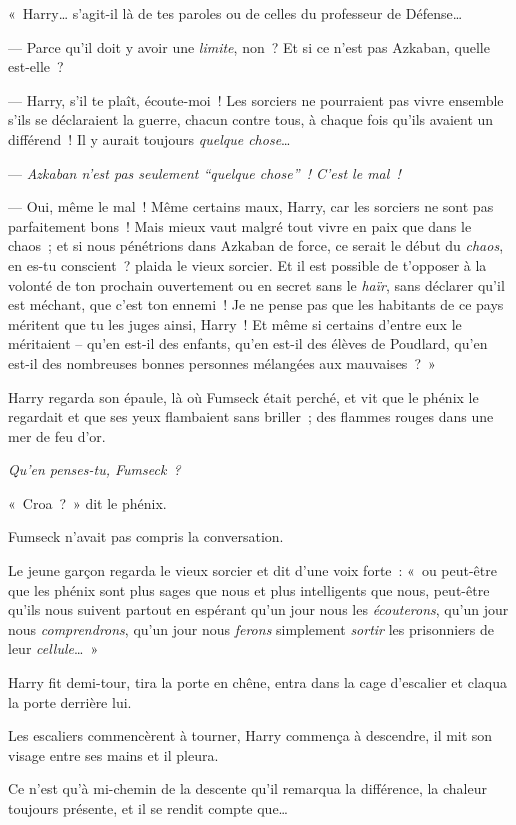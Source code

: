 «~Harry… s'agit-il là de tes paroles ou de celles du professeur de Défense…

--- Parce qu'il doit y avoir une \emph{limite}, non~?
Et si ce n'est pas Azkaban, quelle est-elle~?

--- Harry, s'il te plaît, écoute-moi~!
Les sorciers ne pourraient pas vivre ensemble s'ils se déclaraient la guerre, chacun contre tous, à chaque fois qu'ils avaient un différend~!
Il y aurait toujours \emph{quelque chose}…

--- \emph{Azkaban n'est pas seulement “quelque chose”~!
C'est le mal~!}

--- Oui, même le mal~!
Même certains maux, Harry, car les sorciers ne sont pas parfaitement bons~!
Mais mieux vaut malgré tout vivre en paix que dans le chaos~; et si nous pénétrions dans Azkaban de force, ce serait le début du \emph{chaos}, en es-tu conscient~? plaida le vieux sorcier.
Et il est possible de t'opposer à la volonté de ton prochain ouvertement ou en secret sans le \emph{haïr}, sans déclarer qu'il est méchant, que c'est ton ennemi~!
Je ne pense pas que les habitants de ce pays méritent que tu les juges ainsi, Harry~!
Et même si certains d'entre eux le méritaient -- qu'en est-il des enfants, qu'en est-il des élèves de Poudlard, qu'en est-il des nombreuses bonnes personnes mélangées aux mauvaises~?~»

Harry regarda son épaule, là où Fumseck était perché, et vit que le phénix le regardait et que ses yeux flambaient sans briller~; des flammes rouges dans une mer de feu d'or.

\emph{Qu'en penses-tu, Fumseck~?}

«~Croa~?~»
dit le phénix.

Fumseck n'avait pas compris la conversation.

Le jeune garçon regarda le vieux sorcier et dit d'une voix forte~: «~ou peut-être que les phénix sont plus sages que nous et plus intelligents que nous, peut-être qu'ils nous suivent partout en espérant qu'un jour nous les \emph{écouterons}, qu'un jour nous \emph{comprendrons}, qu'un jour nous \emph{ferons} simplement \emph{sortir} les prisonniers de leur \emph{cellule}…~»

Harry fit demi-tour, tira la porte en chêne, entra dans la cage d'escalier et claqua la porte derrière lui.

Les escaliers commencèrent à tourner, Harry commença à descendre, il mit son visage entre ses mains et il pleura.

Ce n'est qu'à mi-chemin de la descente qu'il remarqua la différence, la chaleur toujours présente, et il se rendit compte que…

